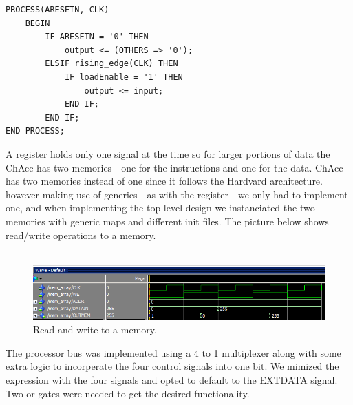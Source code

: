 \documentclass[a4paper,11pt]{article}
\begin{document}
\begin{lstlisting}[frame=single]
PROCESS(ARESETN, CLK)
    BEGIN
        IF ARESETN = '0' THEN
            output <= (OTHERS => '0');
        ELSIF rising_edge(CLK) THEN
            IF loadEnable = '1' THEN
                output <= input;
            END IF;
        END IF;
END PROCESS;
\end{lstlisting}

\noindent
A register holds only one signal at the time so for larger portions of data 
the ChAcc has two memories - one for the instructions and one for the data. 
ChAcc has two memories instead of one since it follows the Hardvard 
architecture. however making use of generics - as with the register - we only 
had to implement one, and when implementing the top-level design we 
instanciated the two memories with generic maps and different init files. 
The picture below shows read/write operations to a memory.\\\\

\begin{figure}[h]
    \centering
    \includegraphics[width=\linewidth]{readwritemem.png}
    \caption{Read and write to a memory.}
    \label{Memory}
\end{figure}

\noindent
The processor bus was implemented using a 4 to 1 multiplexer along with some 
extra logic to incorperate the four control signals into one bit. We mimized 
the expression with the four signals and opted to default to the EXTDATA 
signal. Two or gates were needed to get the desired functionality.
\end{document}
